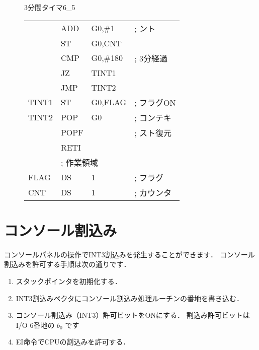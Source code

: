 \begin{figure}[btp]
\begin{reidai}{3分間タイマ}{6_5}
\begin{description}
{\begin{center}
\begin{tabular}{|l|l l l|}
       & ADD    & G0,\#1            & ; ント          \\
       & ST     & G0,CNT            &                 \\
       & CMP    & G0,\#180          & ; 3分経過       \\
       & JZ     & TINT1             &                 \\
       & JMP    & TINT2             &                 \\
TINT1  & ST     & G0,FLAG           & ; フラグON      \\
TINT2  & POP    & G0                & ; コンテキ      \\
       & POPF   &                   & ; スト復元      \\
       & RETI   &                   &                 \\
       & \multicolumn{3}{|l|}{; 作業領域}             \\
FLAG   & DS     & 1                 & ; フラグ        \\
CNT    & DS     & 1                 & ; カウンタ      \\
\hline
\end{tabular}
\end{center}}
\end{description}
\end{reidai}
\end{figure}

\newpage
\section{コンソール割込み}

コンソールパネルの操作でINT3割込みを発生することができます．
コンソール割込みを許可する手順は次の通りです．

\begin{enumerate}
\item スタックポインタを初期化する．

\item INT3割込みベクタにコンソール割込み処理ルーチンの番地を書き込む．

\item コンソール割込み（INT3）許可ビットをONにする．
割込み許可ビットはI/O 6番地の $b_0$ です

\begin{center}
\end{center}

\item EI命令でCPUの割込みを許可する．
\end{enumerate}

